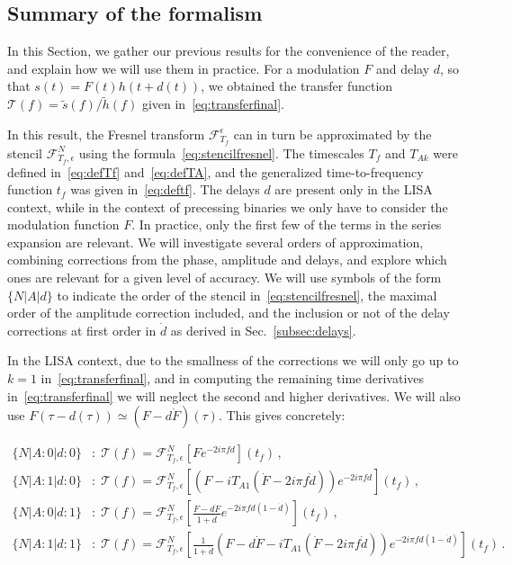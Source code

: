 \documentclass[aps,showpacs,twocolumn,
prd,superscriptaddress,nofootinbib]{revtex4-1}
\newcommand\calF{{\mathcal{F}}}
\newcommand\calT{{\mathcal{T}}}
\newcommand{\Tf}{T_{f}}
\begin{document}
\subsection{Summary of the formalism}\label{subsec:executivesummary}

In this Section, we gather our previous results for the convenience of the reader, and explain how we will use them in practice. For a modulation $F$ and delay $d$, so that $s(t) = F(t) h(t+d(t))$, we obtained the transfer function $\calT (f) = \tilde{s}(f)/\tilde{h}(f)$ given in~\eqref{eq:transferfinal}.

In this result, the Fresnel transform $\calF^{\epsilon}_{\Tf}$ can in turn be approximated by the stencil $\calF^{N}_{\Tf, \epsilon}$ using the formula~\eqref{eq:stencilfresnel}. The timescales $\Tf$ and $T_{Ak}$ were defined in~\eqref{eq:defTf} and~\eqref{eq:defTA}, and the generalized time-to-frequency function $t_{f}$ was given in~\eqref{eq:deftf}. The delays $d$ are present only in the LISA context, while in the context of precessing binaries we only have to consider the modulation function $F$. In practice, only the first few of the terms in the series expansion are relevant. We will investigate several orders of approximation, combining corrections from the phase, amplitude and delays, and explore which ones are relevant for a given level of accuracy. We will use symbols of the form $\{N | A | d\}$ to indicate the order of the stencil in~\eqref{eq:stencilfresnel}, the maximal order of the amplitude correction included, and the inclusion or not of the delay corrections at first order in $\dot{d}$ as derived in Sec.~\ref{subsec:delays}.

In the LISA context, due to the smallness of the corrections we will only go up to $k=1$ in~\eqref{eq:transferfinal}, and in computing the remaining time derivatives in~\eqref{eq:transferfinal} we will neglect the second and higher derivatives. We will also use $F(\tau - d(\tau)) \simeq (F - d \dot{F})(\tau)$. This gives concretely:
\begin{widetext}
\begin{subequations}\label{eq:summaryNAd}
\begin{align}
	\{N | A:0 | d:0\}&: \; \calT(f) = \calF^{N}_{\Tf, \epsilon} \left[ F e^{-2i\pi f d} \right] (t_{f}) \,, \\
	\{N | A:1 | d:0\}&: \; \calT(f) = \calF^{N}_{\Tf, \epsilon} \left[ \left(F - i T_{A1} \left( \dot{F} - 2i\pi f \dot{d}\right) \right) e^{-2i\pi f d} \right] (t_{f}) \,, \\
	\{N | A:0 | d:1\}&: \; \calT(f) = \calF^{N}_{\Tf, \epsilon} \left[ \frac{F - d\dot{F}}{1+\dot{d}} e^{-2i\pi f d (1-\dot{d})} \right] (t_{f})\,, \\
	\{N | A:1 | d:1\}&: \; \calT(f) = \calF^{N}_{\Tf, \epsilon} \left[ \frac{1}{1+\dot{d}}\left(  F - d\dot{F} - i T_{A1} \left( \dot{F} - 2i\pi f \dot{d} \right) \right) e^{-2i\pi f d (1 - \dot{d})} \right] (t_{f})\,.
\end{align}
\end{subequations}
\end{widetext}
\end{document}
